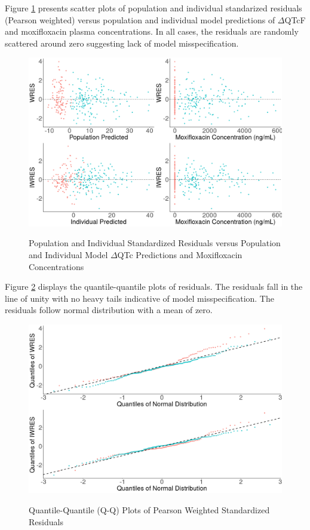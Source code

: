\documentclass[
]{article}
\begin{document}
Figure \ref{fig:res} presents scatter plots of population and individual
standarized residuals (Pearson weighted) versus population and
individual model predictions of \(\Delta\)QTcF and moxifloxacin plasma
concentrations. In all cases, the residuals are randomly scattered
around zero suggesting lack of model misspecification.

\begin{figure}[H]
\caption{Population and Individual Standardized Residuals versus Population and Individual Model $\Delta$QTc Predictions and Moxifloxacin Concentrations} 
\includegraphics[width=\textwidth]{../Report/Figures/res.png}
\label{fig:res}
\end{figure}

Figure \ref{fig:qq} displays the quantile-quantile plots of residuals.
The residuals fall in the line of unity with no heavy tails indicative
of model misspecification. The residuals follow normal distribution with
a mean of zero.

\begin{figure}[H]
\caption{Quantile-Quantile (Q-Q) Plots of Pearson Weighted Standardized Residuals} 
\includegraphics[width=\textwidth]{../Report/Figures/qq.png}
\label{fig:qq}
\end{figure}
\end{document}
